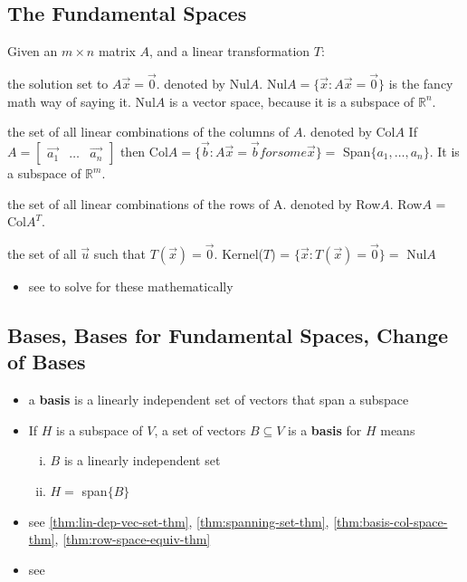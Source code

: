 \documentclass[a4paper,12pt]{article}
\theoremstyle{definition}
\theoremstyle{definition}
\newcommand{\mateq}[3]{#1#2 = #3}
\newcommand{\mateqaxb}{\mateq{A}{\vec{x}}{\vec{b}}}
\newcommand{\mateqaxo}{\mateq{A}{\vec{x}}{\vec{0}}}
\newcommand{\finitevecs}[2]{#1_1,\ldots,#1_#2}
\newcommand{\finitevecsset}[2]{\{\finitevecs{#1}{#2}\}}
\begin{document}
	\subsection{The Fundamental Spaces}
	Given an $m \times n$ matrix $A$, and a linear transformation $T$:
	\begin{description}[style=nextline]
		\item[null space] the solution set to $\mateqaxo$. denoted by Nul$A$. Nul$A = \{\vec{x}: \mateqaxo\}$ is the fancy math way of saying it. Nul$A$ is a vector space, because it is a subspace of $\mathbb{R}^n$.
		
		\item[column space] the set of all linear combinations of the columns of $A$. denoted by Col$A$ If $A =
		\begin{bmatrix}
			\vec{a_1} & \ldots & \vec{a_n}
		\end{bmatrix}$
		then Col$A = \{\vec{b} : \mateqaxb for some \vec{x}\} =$ Span$\finitevecsset{a}{n}$. It is a subspace of $\mathbb{R}^m$.
		
		\item[row space] the set of all linear combinations of the rows of A. denoted by Row$A$. Row$A$ = Col$A^T$.
		
		\item[kernel] the set of all $\vec{u}$ such that $\mateq{T}{(\vec{x})}{\vec{0}}$. Kernel($T$) = $\{\vec{x}: T(\vec{x}) = \vec{0}\} =$ Nul$A$
	\end{description}
	
	\begin{itemize}
		\item see  to solve for these mathematically
	\end{itemize}
	
	\subsection{Bases, Bases for Fundamental Spaces, Change of Bases}
	\begin{itemize}
		\item a \textbf{basis} is a linearly independent set of vectors that span a subspace
		
		\item If $H$ is a subspace of $V$, a set of vectors $B \subseteq V$ is a \textbf{basis} for $H$ means
		\begin{enumerate}[i.]
			\item $B$ is a linearly independent set
			\item $H =$ span$\{B\}$
		\end{enumerate}
		
		\item see \autoref{thm:lin-dep-vec-set-thm}, \autoref{thm:spanning-set-thm}, \autoref{thm:basis-col-space-thm},
		\autoref{thm:row-space-equiv-thm}
		
		\item see 
	\end{itemize}
	
\end{document}
